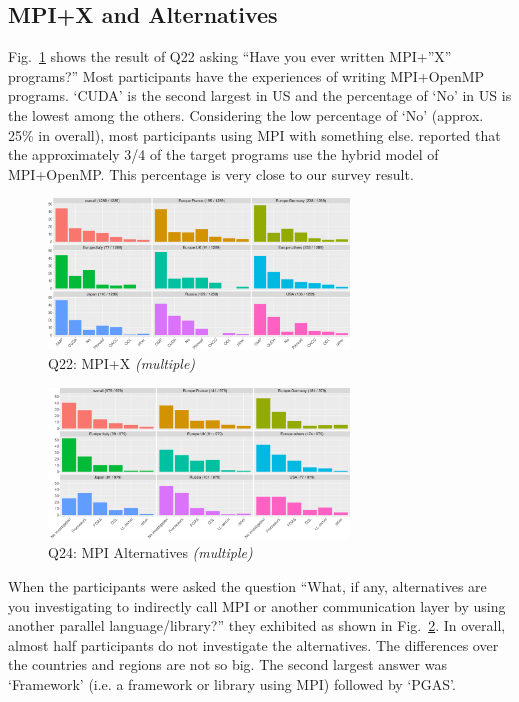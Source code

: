 \documentclass[conference,10pt,letterpaper]{IEEEtran}
\def\myquote#1{`#1'}
\begin{document}
\subsection{MPI+X and Alternatives}

Fig.~\ref{fig:mpi-x} shows the result of Q22 asking ``Have you ever
written MPI+''X'' programs?'' Most participants have the experiences of
writing MPI+OpenMP programs. \myquote{CUDA} is the second largest in
US and the percentage of \myquote{No} in US is the lowest among the
others. Considering the low percentage of \myquote{No} (approx.
25\% in overall), most participants using MPI with something else.
\cite{10.1145/3295500.3356176} reported that the approximately 3/4 of
the target programs use the hybrid model of MPI+OpenMP. This percentage
is very close to our survey result.

\begin{figure}[htb]
\begin{center}
\includegraphics[width=8cm]{R-scripts/Q22.pdf}
\caption{Q22: MPI+X {\it(multiple)}}
\label{fig:mpi-x}
\end{center}
\end{figure}

\begin{figure}[htb]
\begin{center}
\includegraphics[width=8cm]{R-scripts/Q24.pdf}
\caption{Q24: MPI Alternatives {\it(multiple)}}
\label{fig:mpi-alternatives}
\end{center}
\end{figure}

When the participants were asked the question ``What, if any,
alternatives are you investigating to indirectly call MPI or another
communication layer by using another parallel language/library?'' they
exhibited as shown in Fig.~\ref{fig:mpi-alternatives}. In overall,
almost half participants do not investigate the alternatives. The
differences over the countries and regions are not so big. The second
largest answer was \myquote{Framework} (i.e. a framework or library
using MPI) followed by \myquote{PGAS}. 
  
\end{document}
